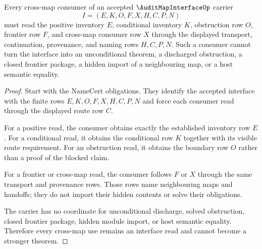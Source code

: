 \begin{theorem}
\label{thm:audit-map-interface-cross-map-consumer-boundary}
Every cross-map consumer of an accepted $\AuditMapInterfaceUp$ carrier
$$
I=(E,K,O,F,X,H,C,P,N)
$$
must read the positive inventory $E$, conditional inventory $K$, obstruction row $O$, frontier row $F$, and cross-map consumer row $X$ through the displayed transport, continuation, provenance, and naming rows $H,C,P,N$. Such a consumer cannot turn the interface into an unconditional theorem, a discharged obstruction, a closed frontier package, a hidden import of a neighbouring map, or a host semantic equality.
\end{theorem}
\begin{proof}
Start with the NameCert obligations. They identify the accepted interface with the finite rows $E,K,O,F,X,H,C,P,N$ and force each consumer read through the displayed route row $C$.

For a positive read, the consumer obtains exactly the established inventory row $E$. For a conditional read, it obtains the conditional row $K$ together with its visible route requirement. For an obstruction read, it obtains the boundary row $O$ rather than a proof of the blocked claim.

For a frontier or cross-map read, the consumer follows $F$ or $X$ through the same transport and provenance rows. Those rows name neighbouring maps and handoffs; they do not import their hidden contents or solve their obligations.

The carrier has no coordinate for unconditional discharge, solved obstruction, closed frontier package, hidden module import, or host semantic equality. Therefore every cross-map use remains an interface read and cannot become a stronger theorem.
\end{proof}


